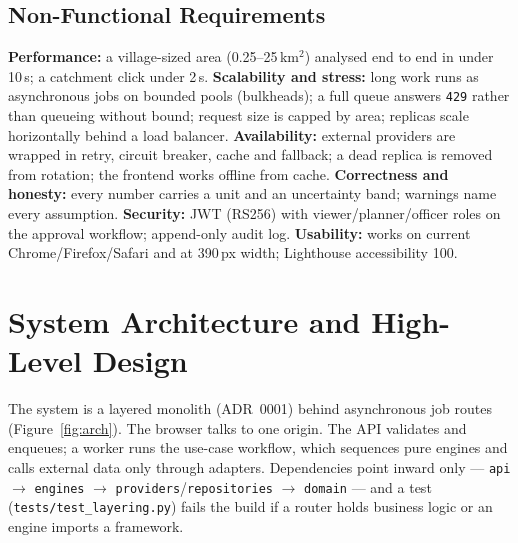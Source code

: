\documentclass[manuscript,screen,review]{acmart}
\begin{document}
\subsection{Non-Functional Requirements}
\textbf{Performance:} a village-sized area (0.25--25\,km$^2$) analysed end to end in under
10\,s; a catchment click under 2\,s. \textbf{Scalability and stress:} long work runs as
asynchronous jobs on bounded pools (bulkheads); a full queue answers \texttt{429} rather than
queueing without bound; request size is capped by area; replicas scale horizontally behind a
load balancer. \textbf{Availability:} external providers are wrapped in retry, circuit
breaker, cache and fallback; a dead replica is removed from rotation; the frontend works
offline from cache. \textbf{Correctness and honesty:} every number carries a unit and an
uncertainty band; warnings name every assumption. \textbf{Security:} JWT (RS256) with
viewer/planner/officer roles on the approval workflow; append-only audit log.
\textbf{Usability:} works on current Chrome/Firefox/Safari and at 390\,px width; Lighthouse
accessibility 100.

\section{System Architecture and High-Level Design}\label{sec:architecture}
The system is a layered monolith (ADR~0001) behind asynchronous job routes
(Figure~\ref{fig:arch}). The browser talks to one origin. The API validates and enqueues; a
worker runs the use-case workflow, which sequences pure engines and calls external data only
through adapters. Dependencies point inward only --- \texttt{api} $\rightarrow$
\texttt{engines} $\rightarrow$ \texttt{providers}/\texttt{repositories} $\rightarrow$
\texttt{domain} --- and a test (\texttt{tests/test\_layering.py}) fails the build if a router
holds business logic or an engine imports a framework.
\end{document}
